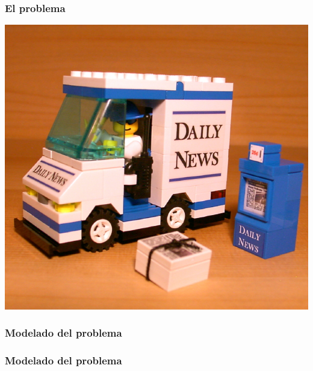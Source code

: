 \documentclass{beamer}
\begin{document}
\begin{frame}
\frametitle{El problema}
\vspace{5mm}
\begin{figure}
	\begin{center}
		
	\end{center}	
\end{figure}
\begin{flushleft}
	\includegraphics[scale=0.15]{img/truck.jpg}
\end{flushleft}
\end{frame}

\begin{frame}
\frametitle{Modelado del problema}
\vspace{5mm}
\begin{figure}
	\begin{center}
		
	\end{center}	
\end{figure}
\end{frame}

\begin{frame}
\frametitle{Modelado del problema}
\vspace{5mm}
\begin{figure}
	\begin{center}
		
	\end{center}	
\end{figure}
\end{frame}
\end{document}
